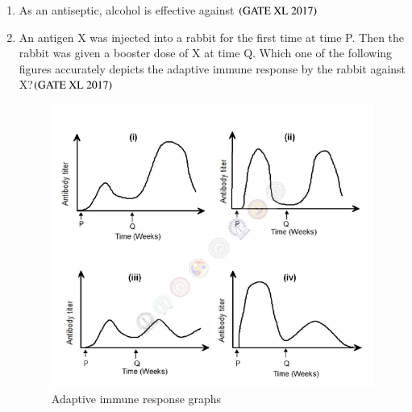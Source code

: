 \documentclass[journal]{IEEEtran}
\begin{document}
\begin{enumerate}
\item As an antiseptic, alcohol is effective against  \hfill $\left(\text{GATE XL 2017}\right)$

\begin{enumerate}
\end{enumerate}


\item An antigen X was injected into a rabbit for the first time at time P. Then the rabbit was given a booster dose of X at time Q. Which one of the following figures accurately depicts the adaptive immune response by the rabbit against X?\hfill $\left(\text{GATE XL 2017}\right)$

\begin{figure}[H]
    \centering
    \includegraphics[width=0.8\columnwidth]{figs/fig_q66.png}
    \caption{Adaptive immune response graphs}
    \label{fig:q66}
\end{figure}

\begin{enumerate}
\end{enumerate}



\end{enumerate}
\end{document}
